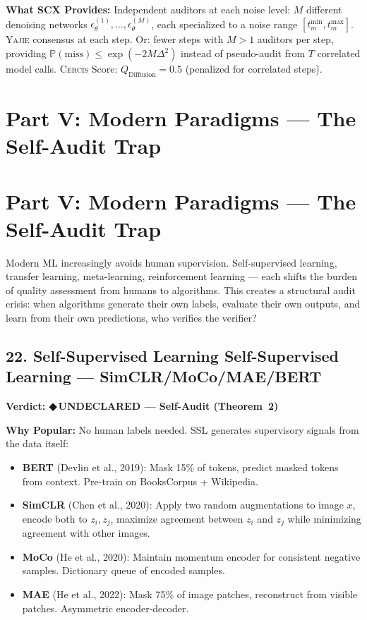 \documentclass[12pt,a4paper]{article}
\theoremstyle{definition}
\newcommand{\guilty}{{\color{guiltycolor}\textbf{◆\,UNDECLARED}}}
\newcommand{\Yajie}{\textsc{Yajie}}
\newcommand{\Cercis}{\textsc{Cercis}}
\newcommand{\Pbb}{\mathbb{P}}
\newcommand{\auditHeader}[1]{\medskip\noindent\textbf{\large #1}\medskip}
\newcommand{\whyPopular}{\noindent\textbf{Why Popular:} }
\newcommand{\whatMissing}{\noindent\textbf{What SCX Provides:} }
\begin{document}
\whatMissing{} Independent auditors at each noise level: $M$ different denoising networks $\epsilon_\theta^{(1)}, \ldots, \epsilon_\theta^{(M)}$, each specialized to a noise range $[t_m^{\min}, t_m^{\max}]$. \Yajie{} consensus at each step. Or: fewer steps with $M>1$ auditors per step, providing $\Pbb(\text{miss}) \le \exp(-2M\Delta^2)$ instead of pseudo-audit from $T$ correlated model calls. \Cercis{} Score: $Q_{\text{Diffusion}} = 0.5$ (penalized for correlated steps).

\section{Part V: Modern Paradigms — The Self-Audit Trap}
\section{Part V: Modern Paradigms --- The Self-Audit Trap}
\label{sec:modern}

Modern ML increasingly avoids human supervision. Self-supervised learning, transfer learning, meta-learning, reinforcement learning — each shifts the burden of quality assessment from humans to algorithms. This creates a structural audit crisis: when algorithms generate their own labels, evaluate their own outputs, and learn from their own predictions, who verifies the verifier?

\subsection{22. Self-Supervised Learning Self-Supervised Learning --- SimCLR/MoCo/MAE/BERT}

\auditHeader{Verdict: \guilty{} — Self-Audit (Theorem~2)}

\whyPopular{} No human labels needed. SSL generates supervisory signals from the data itself:
\begin{itemize}[nosep]
    \item \textbf{BERT} (Devlin et al., 2019): Mask 15\% of tokens, predict masked tokens from context. Pre-train on BooksCorpus + Wikipedia.
    \item \textbf{SimCLR} (Chen et al., 2020): Apply two random augmentations to image $x$, encode both to $z_i, z_j$, maximize agreement between $z_i$ and $z_j$ while minimizing agreement with other images.
    \item \textbf{MoCo} (He et al., 2020): Maintain momentum encoder for consistent negative samples. Dictionary queue of encoded samples.
    \item \textbf{MAE} (He et al., 2022): Mask 75\% of image patches, reconstruct from visible patches. Asymmetric encoder-decoder.
\end{itemize}
\end{document}
